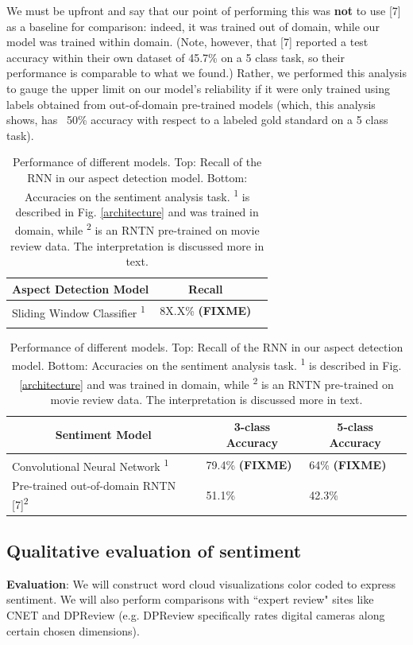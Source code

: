 \documentclass{article} %
\begin{document}
We must be upfront and say that our point of performing this was \textbf{not} to use [7] as a baseline for comparison: indeed, it was trained out of domain, while our model was trained within domain. (Note, however, that [7] reported a test accuracy within their own dataset of 45.7\% on a 5 class task, so their performance is comparable to what we found.) Rather, we performed this analysis to gauge the upper limit on our model's reliability if it were only trained using labels obtained from out-of-domain pre-trained models (which, this analysis shows, has ~50\% accuracy with respect to a labeled gold standard on a 5 class task).

\begin{table}[t]
\begin{center}
\begin{tabular}{lll}
\multicolumn{1}{c}{\bf Aspect Detection Model}  &\multicolumn{1}{c}{\bf Recall}  \\ \hline
Sliding Window Classifier \textsuperscript{1} & 8X.X\% \textbf{(FIXME)} \\
&\\
\end{tabular}
\begin{tabular}{lll}
\multicolumn{1}{c}{\bf Sentiment Model}  &\multicolumn{1}{c}{\bf 3-class Accuracy} &\multicolumn{1}{c}{\bf 5-class Accuracy} \\ \hline
 Convolutional Neural Network \textsuperscript{1} & 79.4\% \textbf{(FIXME)} & 64\% \textbf{(FIXME)} \\
 Pre-trained out-of-domain RNTN [7]\textsuperscript{2}       & 51.1\% & 42.3\% \\
\end{tabular}
\end{center}
\caption{Performance of different models. Top: Recall of the RNN in our aspect detection model. Bottom: Accuracies on the sentiment analysis task. \textsuperscript{1} is described in Fig. \ref{architecture} and was trained in domain, while \textsuperscript{2} is an RNTN pre-trained on movie review data. The interpretation is discussed more in text.}
\label{ModelResultsTable}
\end{table}



\subsection{Qualitative evaluation of sentiment}

\textbf{Evaluation}: We will construct word cloud visualizations color coded to express sentiment. We will also perform comparisons with ``expert review" sites like CNET and DPReview (e.g. DPReview specifically rates digital cameras along certain chosen dimensions).
\end{document}
